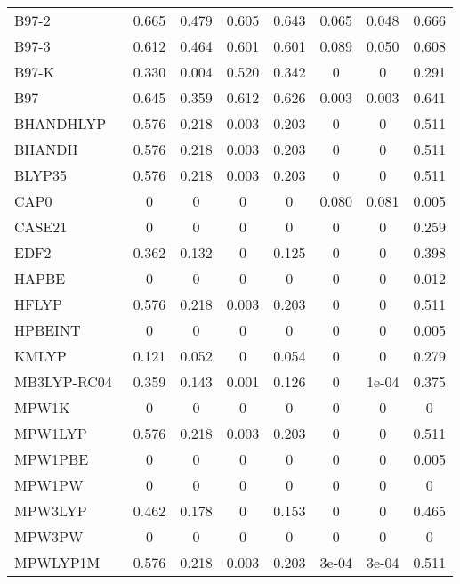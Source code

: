 \begin{table*}
\begin{tabular}{|l|c|c|c|c|c|c|c|}
B97-2~\cite{Wilson2001_9233} & 0.665 & 0.479 & 0.605 & 0.643 & 0.065 & 0.048 & 0.666 \\
B97-3~\cite{Keal2005_121103} & 0.612 & 0.464 & 0.601 & 0.601 & 0.089 & 0.050 & 0.608 \\
B97-K~\cite{Boese2004_3405} & 0.330 & 0.004 & 0.520 & 0.342 & 0 & 0 & 0.291 \\
B97~\cite{Becke1997_8554} & 0.645 & 0.359 & 0.612 & 0.626 & 0.003 & 0.003 & 0.641 \\
BHANDHLYP~\cite{Becke1993_1372,gaussianimplementation} & 0.576 & 0.218 & 0.003 & 0.203 & 0 & 0 & 0.511 \\
BHANDH~\cite{Becke1993_1372,gaussianimplementation} & 0.576 & 0.218 & 0.003 & 0.203 & 0 & 0 & 0.511 \\
BLYP35~\cite{Renz2009_16292,Kaupp2011_16973} & 0.576 & 0.218 & 0.003 & 0.203 & 0 & 0 & 0.511 \\
CAP0~\cite{Carmona2016_120} & 0 & 0 & 0 & 0 & 0.080 & 0.081 & 0.005 \\
CASE21~\cite{Sparrow2022_6896} & 0 & 0 & 0 & 0 & 0 & 0 & 0.259 \\
EDF2~\cite{Lin2004_365} & 0.362 & 0.132 & 0 & 0.125 & 0 & 0 & 0.398 \\
HAPBE~\cite{Fabiano2015_122} & 0 & 0 & 0 & 0 & 0 & 0 & 0.012 \\
HFLYP~\cite{Lee1988_785,Miehlich1989_200} & 0.576 & 0.218 & 0.003 & 0.203 & 0 & 0 & 0.511 \\
HPBEINT~\cite{Fabiano2013_673} & 0 & 0 & 0 & 0 & 0 & 0 & 0.005 \\
KMLYP~\cite{Kang2001_11040} & 0.121 & 0.052 & 0 & 0.054 & 0 & 0 & 0.279 \\
MB3LYP-RC04~\cite{Tognetti2007_381} & 0.359 & 0.143 & 0.001 & 0.126 & 0 & 1e-04 & 0.375 \\
MPW1K~\cite{Lynch2000_4811} & 0 & 0 & 0 & 0 & 0 & 0 & 0 \\
MPW1LYP~\cite{Adamo1998_664} & 0.576 & 0.218 & 0.003 & 0.203 & 0 & 0 & 0.511 \\
MPW1PBE~\cite{Adamo1998_664} & 0 & 0 & 0 & 0 & 0 & 0 & 0.005 \\
MPW1PW~\cite{Adamo1998_664} & 0 & 0 & 0 & 0 & 0 & 0 & 0 \\
MPW3LYP~\cite{Zhao2004_6908} & 0.462 & 0.178 & 0 & 0.153 & 0 & 0 & 0.465 \\
MPW3PW~\cite{Adamo1998_664} & 0 & 0 & 0 & 0 & 0 & 0 & 0 \\
MPWLYP1M~\cite{Schultz2005_11127} & 0.576 & 0.218 & 0.003 & 0.203 & 3e-04 & 3e-04 & 0.511 \\

\end{tabular}
\end{table*}
